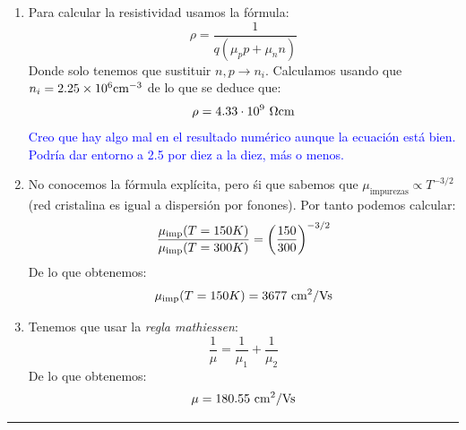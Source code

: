 \begin{enumerate}[label=\alph*)]
	\item Para calcular la resistividad usamos la fórmula:
	\begin{equation}
		\rho = \frac{1}{q(\mu_p p + \mu_n n )}
	\end{equation}
	Donde solo tenemos que sustituir $n,p\rightarrow n_i$. Calculamos usando que $n_i= 2.25\times 10^6 \text{cm}^{-3}$ de lo que se deduce que:
	\begin{equation}
	\rho =4.33\cdot 10^9 \ \Omega \text{cm}
	\end{equation}
	\textcolor{Blue}{Creo que hay algo mal en el resultado numérico aunque la ecuación está bien. Podría dar entorno a 2.5 por diez a la diez, más o menos.}
	\item No conocemos la fórmula explícita, pero śi que sabemos que $\mu_{\text{impurezas}}\propto T^{-3/2}$ (red cristalina es igual a dispersión por fonones). Por tanto podemos calcular:
	\begin{equation}
		\frac{\mu_{\text{imp}} (T=150K)}{\mu_{\text{imp}}(T=300K)} = \left( \frac{150}{300} \right)^{-3/2}		
	\end{equation}
	De lo que obtenemos:
	\begin{equation}
		\mu_{\text{imp}} (T=150K) = 3677 \ \text{cm}^2 / \text{Vs}
	\end{equation}
	\item Tenemos que usar la \textit{regla mathiessen}:
	\begin{equation}
		\frac{1}{\mu} = \frac{1}{\mu_{1}}+\frac{1}{\mu_{2}} 
	\end{equation}
	De lo que obtenemos:		
	\begin{equation}
		\mu = 180.55 \ \text{cm}^2 / \text{Vs} 
	\end{equation}
\end{enumerate}

\rule{\textwidth}{0.1pt} \\[2pt]

